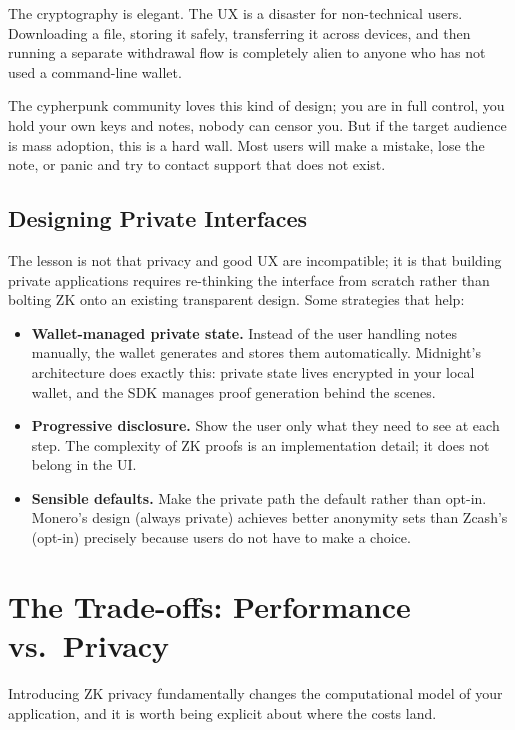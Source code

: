 The cryptography is elegant. The UX is a disaster for non-technical users. Downloading a file, storing it safely, transferring it across devices, and then running a separate withdrawal flow is completely alien to anyone who has not used a command-line wallet.

The cypherpunk community loves this kind of design; you are in full control, you hold your own keys and notes, nobody can censor you. But if the target audience is mass adoption, this is a hard wall. Most users will make a mistake, lose the note, or panic and try to contact support that does not exist.

\subsection*{Designing Private Interfaces}

The lesson is not that privacy and good UX are incompatible; it is that building private applications requires re-thinking the interface from scratch rather than bolting ZK onto an existing transparent design. Some strategies that help:

\begin{itemize}
  \item \textbf{Wallet-managed private state.} Instead of the user handling notes manually, the wallet generates and stores them automatically. Midnight's architecture does exactly this: private state lives encrypted in your local wallet, and the SDK manages proof generation behind the scenes.
  \item \textbf{Progressive disclosure.} Show the user only what they need to see at each step. The complexity of ZK proofs is an implementation detail; it does not belong in the UI.
  \item \textbf{Sensible defaults.} Make the private path the default rather than opt-in. Monero's design (always private) achieves better anonymity sets than Zcash's (opt-in) precisely because users do not have to make a choice.
\end{itemize}

\section{The Trade-offs: Performance vs.\ Privacy} \label{sec:tradeoffs}

Introducing ZK privacy fundamentally changes the computational model of your application, and it is worth being explicit about where the costs land.


